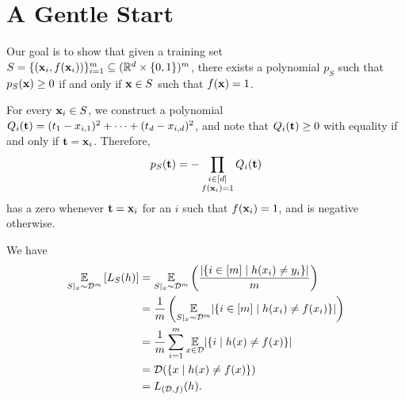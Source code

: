 \chapter{A Gentle Start}

\begin{ex}
  Our goal is to show that given a training set
  $S=\{(\mathbf{x}_i, f(\mathbf{x}_i))\}_{i=1}^m\subseteq (\mathbb{R}^d\times \{0, 1\})^m$,
  there exists a polynomial $p_S$ such that $p_S(\mathbf{x})\geq 0$ if and only if
  $\mathbf{x}\in S$ such that $f(\mathbf{x})=1$.

  For every $\mathbf{x}_i\in S$, we construct a polynomial
  $Q_i(\mathbf{t})=(t_1-x_{i,1})^2+\cdots+(t_d-x_{i,d})^2$,
  and note that $Q_i(\mathbf{t})\geq 0$ with equality if and only if
  $\mathbf{t}=\mathbf{x}_i$. Therefore,
  \begin{align*}
    p_S(\mathbf{t})=-\prod_{\substack{i \in [d] \\ f(\mathbf{x}_i) = 1}}Q_i(\mathbf{t})
  \end{align*}
  has a zero whenever $\mathbf{t}=\mathbf{x}_i$ for an $i$ such that $f(\mathbf{x}_i)=1$, and is
  negative otherwise.
\end{ex}

\begin{ex}
  We have
  \begin{align*}
    \underset{S|_x \sim \mathcal{D}^m}{\mathbb{E}}\left[L_S(h)\right]
     & = \underset{S|_x \sim \mathcal{D}^m}{\mathbb{E}}\left(\frac{|\{i\in[m] \mid h(x_i)\neq y_i\}|}{m}\right)     \\
     & = \frac{1}{m}\left(\underset{S|_x \sim \mathcal{D}^m}{\mathbb{E}}|\{i\in[m] \mid h(x_i)\neq f(x_i)\}|\right) \\
     & = \frac{1}{m}\sum_{i=1}^m\underset{x\in \mathcal{D}}{\mathbb{E}}|\{i \mid h(x)\neq f(x)\}|                   \\
     & = \mathcal{D}(\{x \mid h(x)\neq f(x) \})                                                             \\
     & = L_{(\mathcal{D}, f)}(h).
  \end{align*}
\end{ex}

\begin{ex}
\end{ex}